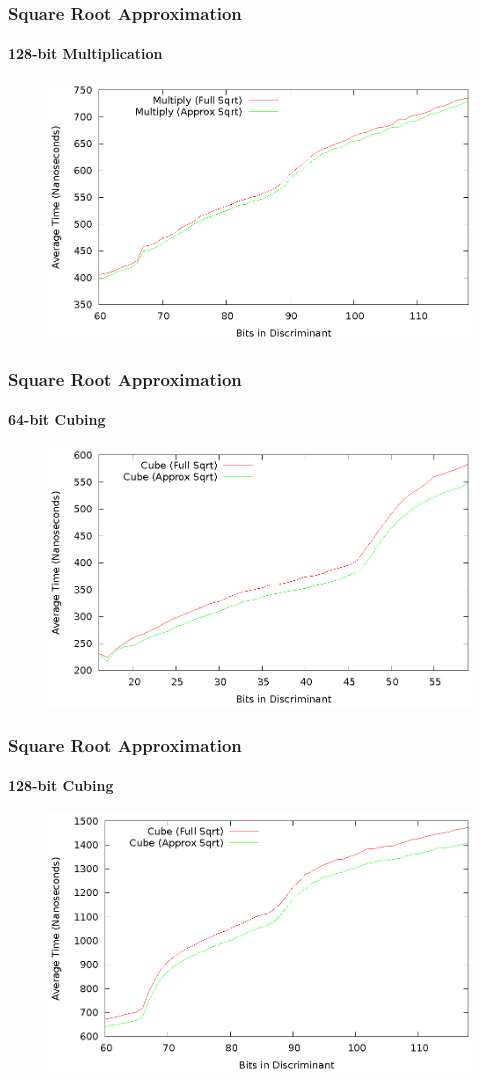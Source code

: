 \documentclass{beamer}
\begin{document}
\begin{frame}
\frametitle{Square Root Approximation}
\framesubtitle{128-bit Multiplication}
\begin{figure}
\includegraphics[scale=0.86]{compose-sqrtopt-128}
\end{figure}
\end{frame}

\begin{frame}
\frametitle{Square Root Approximation}
\framesubtitle{64-bit Cubing}
\begin{figure}
\includegraphics[scale=0.86]{cube-sqrtopt-64}
\end{figure}
\end{frame}

\begin{frame}
\frametitle{Square Root Approximation}
\framesubtitle{128-bit Cubing}
\begin{figure}
\includegraphics[scale=0.86]{cube-sqrtopt-128}
\end{figure}
\end{frame}
\end{document}

